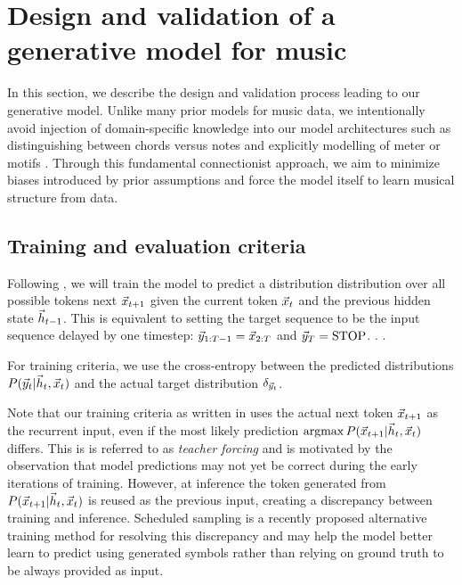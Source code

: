 \section{Design and validation of a generative model for music}

In this section, we describe the design and validation process leading to our
generative model. Unlike many prior models for music data, we intentionally avoid
injection of domain-specific knowledge into our model architectures such as
distinguishing between chords versus notes
\citep{hild1991harmonet}\citep{mozer1994neural} \citep{Eck2002} and explicitly
modelling of meter \citep{eck2008learning} or motifs
\citep{feulner1994melonet}. Through this fundamental connectionist approach, we
aim to minimize biases introduced by prior assumptions and force the model
itself to learn musical structure from data.

\subsection{Training and evaluation criteria}

Following \citep{mozer1994neural}, we will train the model to predict a distribution
distribution over all possible tokens next $\vec{x}_{t+1}$ given the current token
$\vec{x}_{t}$ and the previous hidden state $\vec{h}_{t-1}$. This is equivalent to
setting the target sequence to be the input sequence delayed by one timestep:
$\vec{y}_{1:T-1} = \vec{x}_{2:T}$ and $\vec{y}_T = \text{STOP}$. .
.

For training criteria, we use the cross-entropy between the predicted
distributions $P(\vec{y}_t | \vec{h}_t, \vec{x}_t)$ and the actual target distribution
$\delta_{\vec{y}_t}$.

Note that our training criteria as written in  uses the actual
next token $\vec{x}_{t+1}$ as the recurrent input, even if the most likely
prediction $\operatorname*{argmax} P(\vec{x}_{t+1} | \vec{h}_t, \vec{x}_t)$ differs. This is is referred to
as \emph{teacher forcing}\citep{williams1989learning} and is motivated by the
observation that model predictions may not yet be correct during the early
iterations of training. However, at inference the token generated from
$P(\vec{x}_{t+1} | \vec{h}_t, \vec{x}_t)$ is reused as the previous input, creating a
discrepancy between training and inference. Scheduled sampling
\citep{bengio2015scheduled} is a recently proposed alternative training method
for resolving this discrepancy and may help the model better learn to predict
using generated symbols rather than relying on ground truth to be always
provided as input.

